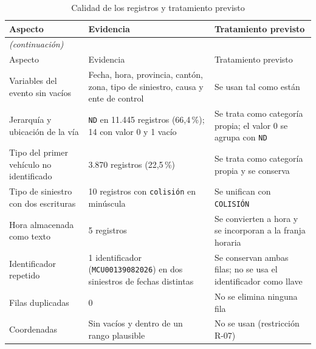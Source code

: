 \begin{longtable}{p{3.0cm}p{5.4cm}p{4.8cm}}
\caption{Calidad de los registros y tratamiento previsto}\label{tab:a3}\\
\toprule
Aspecto & Evidencia & Tratamiento previsto \\
\midrule
\endfirsthead
\multicolumn{3}{l}{\footnotesize\itshape (continuación)}\\
\toprule
Aspecto & Evidencia & Tratamiento previsto \\
\midrule
\endhead
\bottomrule
\endfoot
Variables del evento sin vacíos & Fecha, hora, provincia, cantón, zona, tipo de siniestro, causa y ente de control & Se usan tal como están \\
Jerarquía y ubicación de la vía & \texttt{ND} en 11.445 registros (66,4\,\%); 14 con valor 0 y 1 vacío & Se trata como categoría propia; el valor 0 se agrupa con \texttt{ND} \\
Tipo del primer vehículo no identificado & 3.870 registros (22,5\,\%) & Se trata como categoría propia y se conserva \\
Tipo de siniestro con dos escrituras & 10 registros con \texttt{colisión} en minúscula & Se unifican con \texttt{COLISIÓN} \\
Hora almacenada como texto & 5 registros & Se convierten a hora y se incorporan a la franja horaria \\
Identificador repetido & 1 identificador (\texttt{MCU00139082026}) en dos siniestros de fechas distintas & Se conservan ambas filas; no se usa el identificador como llave \\
Filas duplicadas & 0 & No se elimina ninguna fila \\
Coordenadas & Sin vacíos y dentro de un rango plausible & No se usan (restricción R-07) \\
\end{longtable}
